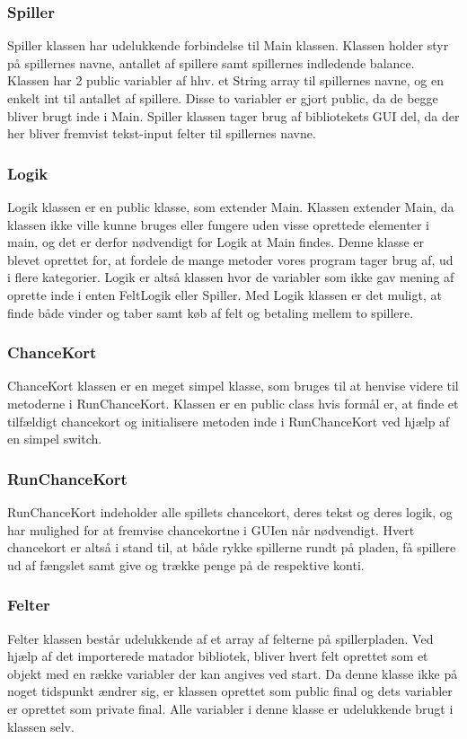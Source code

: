 \subsubsection{Spiller}
Spiller klassen har udelukkende forbindelse til Main klassen. Klassen holder styr på spillernes navne, antallet af spillere samt spillernes indledende balance. Klassen har 2 public variabler af hhv. et String array til spillernes navne, og en enkelt int til antallet af spillere. Disse to variabler er gjort public, da de begge bliver brugt inde i Main. Spiller klassen tager brug af bibliotekets GUI del, da der her bliver fremvist tekst-input felter til spillernes navne.

\subsubsection{Logik}
Logik klassen er en public klasse, som extender Main. Klassen extender Main, da klassen ikke ville kunne bruges eller fungere uden visse oprettede elementer i main, og det er derfor nødvendigt for Logik at Main findes. Denne klasse er blevet oprettet for, at fordele de mange metoder vores program tager brug af, ud i flere kategorier. Logik er altså klassen hvor de variabler som ikke gav mening af oprette inde i enten FeltLogik eller Spiller. Med Logik klassen er det muligt, at finde både vinder og taber samt køb af felt og betaling mellem to spillere.

\subsubsection{ChanceKort}
ChanceKort klassen er en meget simpel klasse, som bruges til at henvise videre til metoderne i RunChanceKort. Klassen er en public class hvis formål er, at finde et tilfældigt chancekort og initialisere metoden inde i RunChanceKort ved hjælp af en simpel switch.

\subsubsection{RunChanceKort}
RunChanceKort indeholder alle spillets chancekort, deres tekst og deres logik, og har mulighed for at fremvise chancekortne i GUIen når nødvendigt. Hvert chancekort er altså i stand til, at både rykke spillerne rundt på pladen, få spillere ud af fængslet samt give og trække penge på de respektive konti.

\subsubsection{Felter}
Felter klassen består udelukkende af et array af felterne på spillerpladen. Ved hjælp af det importerede matador bibliotek, bliver hvert felt oprettet som et objekt med en række variabler der kan angives ved start. Da denne klasse ikke på noget tidspunkt ændrer sig, er klassen oprettet som public final og dets variabler er oprettet som private final. Alle variabler i denne klasse er udelukkende brugt i klassen selv.

